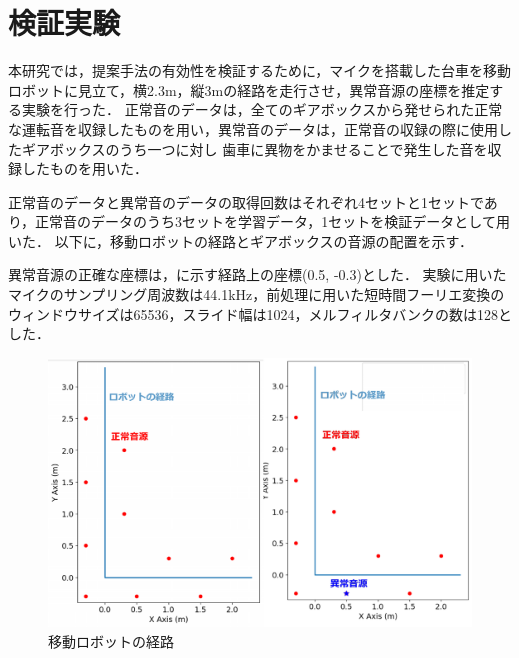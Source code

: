 \documentclass[../main]{subfiles}
\begin{document}
\graphicspath{{../figures/}}

\section{検証実験}
本研究では，提案手法の有効性を検証するために，マイクを搭載した台車を移動ロボットに見立て，横2.3m，縦3mの経路を走行させ，異常音源の座標を推定する実験を行った．
正常音のデータは，全てのギアボックスから発せられた正常な運転音を収録したものを用い，異常音のデータは，正常音の収録の際に使用したギアボックスのうち一つに対し
歯車に異物をかませることで発生した音を収録したものを用いた．


正常音のデータと異常音のデータの取得回数はそれぞれ4セットと1セットであり，正常音のデータのうち3セットを学習データ，1セットを検証データとして用いた．
以下に，移動ロボットの経路とギアボックスの音源の配置を示す．


異常音源の正確な座標は，に示す経路上の座標(0.5, -0.3)とした．
実験に用いたマイクのサンプリング周波数は44.1kHz，前処理に用いた短時間フーリエ変換のウィンドウサイズは65536，スライド幅は1024，メルフィルタバンクの数は128とした．
\begin{figure}[tb]
  \centering
  \includegraphics[keepaspectratio, width=0.8\linewidth]{route.pdf}
  \caption{移動ロボットの経路}
\end{figure}
\end{document}
